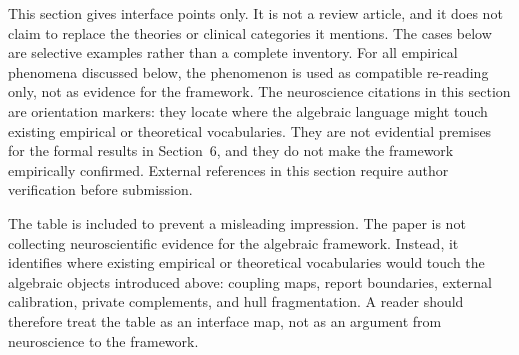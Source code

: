 \documentclass[12pt]{article}
\theoremstyle{definition}
\theoremstyle{remark}
\begin{document}
This section gives interface points only. It is not a review article,
and it does not claim to replace the theories or clinical categories it
mentions. The cases below are selective examples rather than a complete
inventory. For all empirical phenomena discussed below, the phenomenon
is used as compatible re-reading only, not as evidence for the
framework. The neuroscience citations in this section are orientation
markers: they locate where the algebraic language might touch existing
empirical or theoretical vocabularies. They are not evidential premises
for the formal results in Section~6, and they do not make the framework
empirically confirmed. External references in this section require
author verification before submission.

The table is included to prevent a misleading impression. The paper is
not collecting neuroscientific evidence for the algebraic framework.
Instead, it identifies where existing empirical or theoretical
vocabularies would touch the algebraic objects introduced above:
coupling maps, report boundaries, external calibration, private
complements, and hull fragmentation. A reader should therefore treat
the table as an interface map, not as an argument from neuroscience to
the framework.
\end{document}
